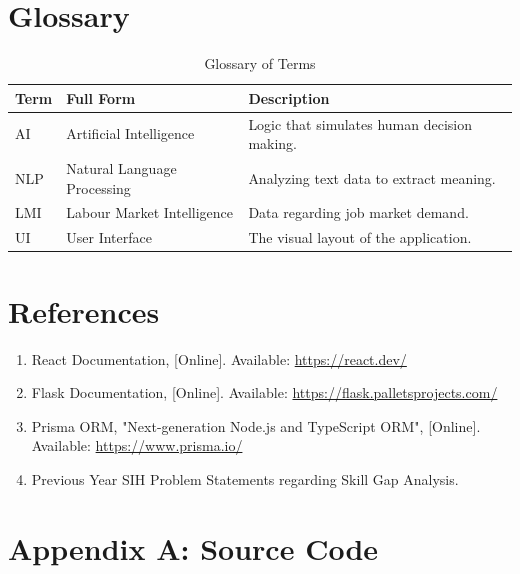 \documentclass[12pt,a4paper]{report}
\begin{document}
\chapter{Glossary}
\begin{table}[H]
\centering
\begin{tabular}{|p{3cm}|p{4cm}|p{7cm}|}
\hline
\textbf{Term} & \textbf{Full Form} & \textbf{Description} \\
\hline
AI & Artificial Intelligence & Logic that simulates human decision making. \\
\hline
NLP & Natural Language Processing & Analyzing text data to extract meaning. \\
\hline
LMI & Labour Market Intelligence & Data regarding job market demand. \\
\hline
UI & User Interface & The visual layout of the application. \\
\hline
\end{tabular}
\caption{Glossary of Terms}
\end{table}

\chapter{References}
\begin{enumerate}
    \item React Documentation, [Online]. Available: \url{https://react.dev/}
    \item Flask Documentation, [Online]. Available: \url{https://flask.palletsprojects.com/}
    \item Prisma ORM, "Next-generation Node.js and TypeScript ORM", [Online]. Available: \url{https://www.prisma.io/}
    \item Previous Year SIH Problem Statements regarding Skill Gap Analysis.
\end{enumerate}


\chapter*{Appendix A: Source Code}
\end{document}
